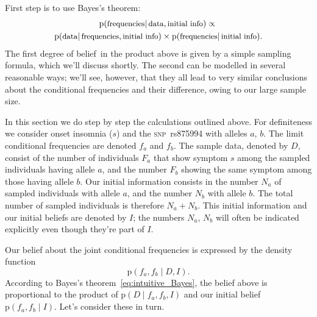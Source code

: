 \documentclass[\ifafour a4paper,12pt,\else a5paper,10pt,\fi%
onecolumn,oneside,article,%
british%
]{memoir}
\theoremstyle{remark}
\theoremstyle{innote}
\newcommand*{\pf}{\mathrm{p}}%
\renewcommand*{\|}{\mathpunct{|}}
\newcommand*{\ptext}[1]{\text{\small #1}}
\newcommand*{\dob}{degree of belief}
\newcommand*{\snp}{\textsc{snp}}
\newcommand*{\yD}{D}
\newcommand*{\yI}{I}
\newcommand*{\ya}{a}
\newcommand*{\yb}{b}
\newcommand*{\ysS}{s}%
\begin{document}
 First
step is to use Bayes's theorem:
\begin{multline}
  \label{eq:intuitive_Bayes}
  \pf(\ptext{frequencies} \| \ptext{data}, \ptext{initial info})
  \propto{}\\
  \pf(\ptext{data} \| \ptext{frequencies}, \ptext{initial info})
  \times
  \pf(\ptext{frequencies} \| \ptext{initial info}).
\end{multline}
The first \dob\ in the product above is given by a simple sampling formula,
which we'll discuss shortly. The second can be modelled in several
reasonable ways; we'll see, however, that they all lead to very similar
conclusions about the conditional frequencies and their difference, owing to
our large sample size.


In this section we do step by step the calculations outlined above. For
definiteness we consider onset insomnia ($\ysS$) and the \snp\ rs875994
with alleles $\ya$, $\yb$. The limit conditional frequencies are denoted
$f_{\ya}$ and $f_{\yb}$. The sample data, denoted by $\yD$,
consist of the number of individuals $F_{\ya}$ that show symptom
$\ysS$ among the sampled individuals having allele $\ya$, and the number
$F_{\yb}$ showing the same symptom among those having allele $\yb$.
Our initial information consists in the number $N_{\ya}$ of sampled
individuals with allele $\ya$, and the number $N_{\yb}$ with allele $\yb$.
The total number of sampled individuals is therefore $N_{\ya}+N_{\yb}$.
This initial information and our initial beliefs are denoted by $\yI$; the
numbers $N_{\ya}$, $N_{\yb}$ will often be indicated explicitly even though
they're part of $\yI$.

Our belief about the joint conditional frequencies is expressed by the
density function
\begin{equation}
  \label{eq:joint_belief_f}
  \pf(f_{\ya}, f_{\yb} \| \yD, \yI).
\end{equation}
According to Bayes's theorem~\eqref{eq:intuitive_Bayes}, the belief above
is proportional to the product of
$\pf(\yD \| f_{\ya}, f_{\yb}, \yI)$ and our initial belief
$\pf(f_{\ya}, f_{\yb} \| \yI)$. Let's consider these in turn.


\medskip
\end{document}
